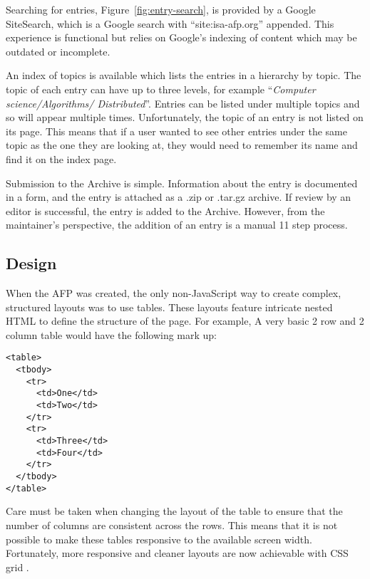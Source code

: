 \documentclass[bsc,frontabs,oneside,singlespacing,parskip,deptreport,logo]{infthesis}
\begin{document}
Searching for entries, Figure~\ref{fig:entry-search}, is provided by a Google SiteSearch, which is a Google search with ``site:isa-afp.org'' appended. This experience is functional but relies on Google's indexing of content which may be outdated or incomplete. 

An index of topics is available which lists the entries in a hierarchy by topic. The topic of each entry can have up to three levels, for example ``\textit{Computer science/Algorithms/ Distributed}''. Entries can be listed under multiple topics and so will appear multiple times. Unfortunately, the topic of an entry is not listed on its page. This means that if a user wanted to see other entries under the same topic as the one they are looking at, they would need to remember its name and find it on the index page.

Submission to the Archive is simple. Information about the entry is documented in a form, and the entry is attached as a .zip or .tar.gz archive. If review by an editor is successful, the entry is added to the Archive. However, from the maintainer's perspective, the addition of an entry is a manual 11 step process. 


\subsection{Design}

When the AFP was created, the only non-JavaScript way to create complex, structured layouts was to use tables. These layouts feature intricate nested HTML to define the structure of the page. For example, A very basic 2 row and 2 column table would have the following mark up:


{\footnotesize
\begin{verbatim}
<table>
  <tbody>
    <tr>
      <td>One</td>
      <td>Two</td>
    </tr>
    <tr>
      <td>Three</td>
      <td>Four</td>
    </tr>
  </tbody>
</table>
\end{verbatim}
}

Care must be taken when changing the layout of the table to ensure that the number of columns are consistent across the rows. This means that it is not possible to make these tables responsive to the available screen width. Fortunately, more responsive and cleaner layouts are now achievable with CSS grid \cite{w3c_css_2020}.
\end{document}
